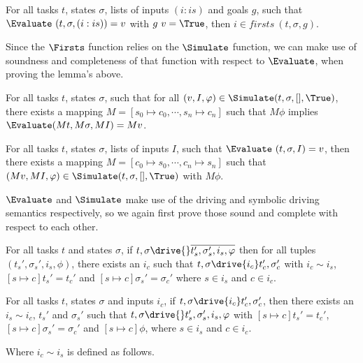 \begin{lemma}
  \label{lem:completefirsts}

  For all tasks $t$, states $\sigma$, lists of inputs $(i:is)$ and goals $g$,
  such that $\Evaluate\ (t,\sigma,(i:is))=v$ with $g\ v =\True$,
  then $i\in firsts\ (t,\sigma,g)$.

\end{lemma}


Since the $\Firsts$ function relies on the $\Simulate$ function, we can make use of soundness and completeness of that function with respect to $\Evaluate$, when proving the lemma's above.

\begin{lemma}
  \label{lem:soundsimulate}

  For all tasks $t$, states $\sigma$,
  such that for all $(v,I,\phi)\in \Simulate (t,\sigma,[],\True)$,
  there exists a mapping $M = [s_0\mapsto c_0,\cdots,s_n\mapsto c_n]$
  such that $M\phi$ implies $\Evaluate (M t,M \sigma,M I) = M v$.
\end{lemma}

\begin{lemma}
  \label{lem:completesimulate}
  For all tasks $t$, states $\sigma$, lists of inputs $I$,
  such that $\Evaluate\ (t,\sigma,I)=v$,
  then there exists a mapping $M = [c_0\mapsto s_0,\cdots,c_n\mapsto s_n]$
  such that $(M v,M I,\phi)\in\Simulate(t,\sigma,[],\True)$ with $M \phi$.
\end{lemma}


$\Evaluate$ and $\Simulate$ make use of the driving and symbolic driving semantics respectively, so we again first prove those sound and complete with respect to each other.

\begin{lemma}
  \label{lem:sounddriving}
  For all tasks $t$ and states $\sigma$,
  if $t,\sigma\drive{} \overline{t_s',\sigma_s',i_s,\phi}$
  then for all tuples $(t_s',\sigma_s',i_s,\phi)$,
  there exists an $i_c$ such that
  $t,\sigma\drive{i_c}t_c',\sigma_c'$
  with $i_c\sim i_s$, $[s\mapsto c]t_s'=t_c'$ and $[s\mapsto c]\sigma_s'=\sigma_c'$ where $s\in i_s$ and $c\in i_c$.
\end{lemma}

\begin{lemma}
  \label{lem:completedriving}
  For all tasks $t$, states $\sigma$ and inputs $i_c$,
  if $t,\sigma\drive{i_c}t_c',\sigma_c'$,
  then there exists an $i_s\sim i_c$, $t_s'$ and $\sigma_s'$
  such that $t,\sigma\drive{}t_s',\sigma_s',i_s,\phi$
  with $[s\mapsto c]t_s'=t_c'$, $[s\mapsto c]\sigma_s'=\sigma_c'$ and $[s\mapsto c]\phi$, where $s\in i_s$ and $c\in i_c$.
\end{lemma}
Where $i_c\sim i_s$ is defined as follows.

